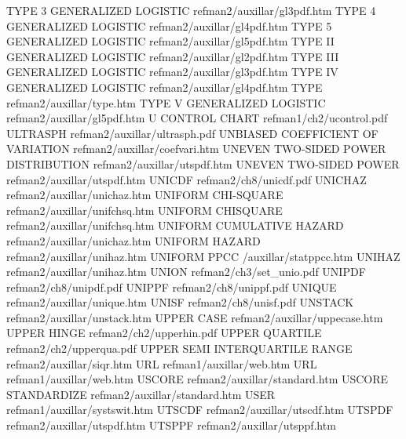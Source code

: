 TYPE 3 GENERALIZED LOGISTIC             refman2/auxillar/gl3pdf.htm
TYPE 4 GENERALIZED LOGISTIC             refman2/auxillar/gl4pdf.htm
TYPE 5 GENERALIZED LOGISTIC             refman2/auxillar/gl5pdf.htm
TYPE II GENERALIZED LOGISTIC            refman2/auxillar/gl2pdf.htm
TYPE III GENERALIZED LOGISTIC           refman2/auxillar/gl3pdf.htm
TYPE IV GENERALIZED LOGISTIC            refman2/auxillar/gl4pdf.htm
TYPE                                    refman2/auxillar/type.htm
TYPE V GENERALIZED LOGISTIC             refman2/auxillar/gl5pdf.htm
U CONTROL CHART                         refman1/ch2/ucontrol.pdf
ULTRASPH                                refman2/auxillar/ultrasph.pdf
UNBIASED  COEFFICIENT OF VARIATION      refman2/auxillar/coefvari.htm
UNEVEN TWO-SIDED POWER DISTRIBUTION     refman2/auxillar/utspdf.htm
UNEVEN TWO-SIDED POWER                  refman2/auxillar/utspdf.htm
UNICDF                                  refman2/ch8/unicdf.pdf
UNICHAZ                                 refman2/auxillar/unichaz.htm
UNIFORM CHI-SQUARE                      refman2/auxillar/unifchsq.htm
UNIFORM CHISQUARE                       refman2/auxillar/unifchsq.htm
UNIFORM CUMULATIVE HAZARD               refman2/auxillar/unichaz.htm
UNIFORM HAZARD                          refman2/auxillar/unihaz.htm
UNIFORM PPCC                            /auxillar/statppcc.htm
UNIHAZ                                  refman2/auxillar/unihaz.htm
UNION                                   refman2/ch3/set_unio.pdf
UNIPDF                                  refman2/ch8/unipdf.pdf
UNIPPF                                  refman2/ch8/unippf.pdf
UNIQUE                                  refman2/auxillar/unique.htm
UNISF                                   refman2/ch8/unisf.pdf
UNSTACK                                 refman2/auxillar/unstack.htm
UPPER CASE                              refman2/auxillar/uppecase.htm
UPPER HINGE                             refman2/ch2/upperhin.pdf
UPPER QUARTILE                          refman2/ch2/upperqua.pdf
UPPER SEMI INTERQUARTILE RANGE          refman2/auxillar/siqr.htm
URL                                     refman1/auxillar/web.htm
URL                                     refman1/auxillar/web.htm
USCORE                                  refman2/auxillar/standard.htm
USCORE STANDARDIZE                      refman2/auxillar/standard.htm
USER                                    refman1/auxillar/systswit.htm
UTSCDF                                  refman2/auxillar/utscdf.htm
UTSPDF                                  refman2/auxillar/utspdf.htm
UTSPPF                                  refman2/auxillar/utsppf.htm
